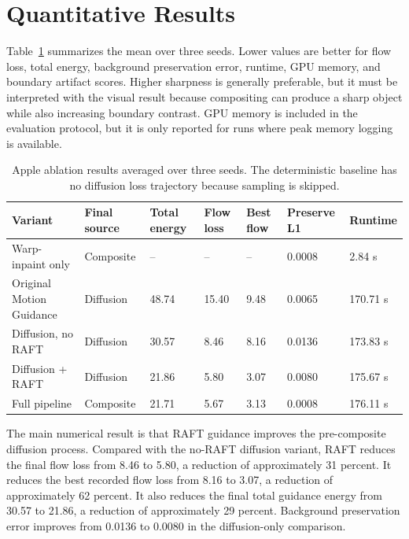 \section{Quantitative Results}

Table~\ref{tab:apple-ablation-metrics} summarizes the mean over three seeds. Lower values are better for flow loss, total energy, background preservation error, runtime, GPU memory, and boundary artifact scores. Higher sharpness is generally preferable, but it must be interpreted with the visual result because compositing can produce a sharp object while also increasing boundary contrast. GPU memory is included in the evaluation protocol, but it is only reported for runs where peak memory logging is available.

\begin{table}[p]
  \centering
  \tiny
  \caption{Apple ablation results averaged over three seeds. The deterministic baseline has no diffusion loss trajectory because sampling is skipped.}
  \label{tab:apple-ablation-metrics}
  \renewcommand{\arraystretch}{1.12}
  \begin{tabular}{p{1.1in}|p{0.52in}|p{0.62in}|p{0.62in}|p{0.68in}|p{0.73in}|p{0.65in}}
    \hline
    \textbf{Variant} & \textbf{Final source} & \textbf{Total energy} & \textbf{Flow loss} & \textbf{Best flow} & \textbf{Preserve L1} & \textbf{Runtime} \\ \hline \hline
    Warp-inpaint only & Composite & -- & -- & -- & 0.0008 & 2.84 s \\ \hline
    Original Motion Guidance & Diffusion & 48.74 & 15.40 & 9.48 & 0.0065 & 170.71 s \\ \hline
    Diffusion, no RAFT & Diffusion & 30.57 & 8.46 & 8.16 & 0.0136 & 173.83 s \\ \hline
    Diffusion + RAFT & Diffusion & 21.86 & 5.80 & 3.07 & 0.0080 & 175.67 s \\ \hline
    Full pipeline & Composite & 21.71 & 5.67 & 3.13 & 0.0008 & 176.11 s \\ \hline
  \end{tabular}
\end{table}

The main numerical result is that RAFT guidance improves the pre-composite diffusion process. Compared with the no-RAFT diffusion variant, RAFT reduces the final flow loss from 8.46 to 5.80, a reduction of approximately 31 percent. It reduces the best recorded flow loss from 8.16 to 3.07, a reduction of approximately 62 percent. It also reduces the final total guidance energy from 30.57 to 21.86, a reduction of approximately 29 percent. Background preservation error improves from 0.0136 to 0.0080 in the diffusion-only comparison.

